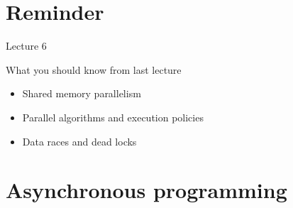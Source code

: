 \documentclass[12pt,t]{beamer}
\title{\coursename}
\subtitle{Lecture 7: Asynchronous programming }
\date {
 \tiny \url{\courseurl}
\vspace{2cm}
\doclicenseThis  
  
}
\begin{document}
 {
    \frame {
        \titlepage
    }
}

\frame{

\tableofcontents

}


\section{Reminder}
\begin{frame}{Lecture 6}
\begin{block}{What you should know from last lecture}
\begin{itemize}
\item Shared memory parallelism
\item Parallel algorithms and execution policies
\item Data races and dead locks
\end{itemize}
\end{block}
\end{frame}


\section{Asynchronous programming}
\end{document}
